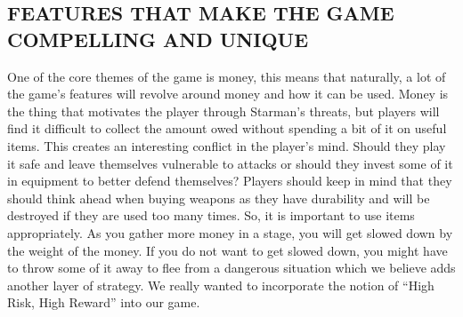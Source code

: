 \documentclass{article}
\begin{document}
\subsection{FEATURES THAT MAKE THE GAME COMPELLING AND UNIQUE \label{features}}
One of the core themes of the game is money, this means that naturally, a lot of the game's features will revolve around money and how it can be used. Money is the thing that motivates the player through Starman's threats, but players will find it difficult to collect the amount owed without spending a bit of it on useful items. This creates an interesting conflict in the player's mind. Should they play it safe and leave themselves vulnerable to attacks or should they invest some of it in equipment to better defend themselves? Players should keep in mind that they should think ahead when buying weapons as they have durability and will be destroyed if they are used too many times. So, it is important to use items appropriately. As you gather more money in a stage, you will get slowed down by the weight of the money. If you do not want to get slowed down, you might have to throw some of it away to flee from a dangerous situation which we believe adds another layer of strategy. We really wanted to incorporate the notion of “High Risk, High Reward” into our game.
\end{document}
